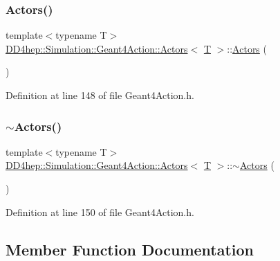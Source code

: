 \subsubsection{\texorpdfstring{Actors()}{Actors()}}
{\footnotesize\ttfamily template$<$typename T$>$ \\
\hyperlink{class_d_d4hep_1_1_simulation_1_1_geant4_action_1_1_actors}{D\+D4hep\+::\+Simulation\+::\+Geant4\+Action\+::\+Actors}$<$ \hyperlink{class_t}{T} $>$\+::\hyperlink{class_d_d4hep_1_1_simulation_1_1_geant4_action_1_1_actors}{Actors} (\begin{DoxyParamCaption}{ }\end{DoxyParamCaption})\hspace{0.3cm}{\ttfamily [inline]}}



Definition at line 148 of file Geant4\+Action.\+h.

\hypertarget{class_d_d4hep_1_1_simulation_1_1_geant4_action_1_1_actors_a3c0f3b0099d834512cbdb13c9555c783}{}\label{class_d_d4hep_1_1_simulation_1_1_geant4_action_1_1_actors_a3c0f3b0099d834512cbdb13c9555c783} 
\subsubsection{\texorpdfstring{$\sim$\+Actors()}{~Actors()}}
{\footnotesize\ttfamily template$<$typename T$>$ \\
\hyperlink{class_d_d4hep_1_1_simulation_1_1_geant4_action_1_1_actors}{D\+D4hep\+::\+Simulation\+::\+Geant4\+Action\+::\+Actors}$<$ \hyperlink{class_t}{T} $>$\+::$\sim$\hyperlink{class_d_d4hep_1_1_simulation_1_1_geant4_action_1_1_actors}{Actors} (\begin{DoxyParamCaption}{ }\end{DoxyParamCaption})\hspace{0.3cm}{\ttfamily [inline]}}



Definition at line 150 of file Geant4\+Action.\+h.



\subsection{Member Function Documentation}
\hypertarget{class_d_d4hep_1_1_simulation_1_1_geant4_action_1_1_actors_af07f7dfb10fad18b8580460f44c88f49}{}\label{class_d_d4hep_1_1_simulation_1_1_geant4_action_1_1_actors_af07f7dfb10fad18b8580460f44c88f49} 
